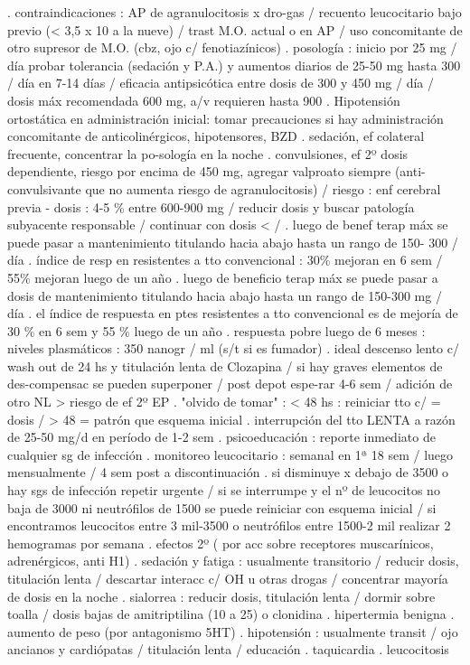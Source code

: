 . contraindicaciones : AP de agranulocitosis x dro-gas / recuento leucocitario bajo previo (< 3,5 x 10 a la nueve) / trast M.O. actual o en AP / uso concomitante de otro supresor de M.O. (cbz, ojo c/ fenotiazínicos)
. posología : inicio por 25 mg / día probar tolerancia (sedación y P.A.) y aumentos diarios de 25-50 mg hasta 300 / día en 7-14 días / eficacia antipsicótica entre dosis de 300 y 450 mg / día / dosis máx recomendada 600 mg, a/v requieren hasta 900
. Hipotensión ortostática en administración inicial: tomar precauciones si hay administración concomitante de anticolinérgicos, hipotensores, BZD
. sedación, ef colateral frecuente, concentrar la po-sología en la noche
. convulsiones, ef 2º dosis dependiente, riesgo por encima de 450 mg, agregar valproato siempre (anti-convulsivante que no aumenta riesgo de agranulocitosis) / riesgo : enf cerebral previa - dosis : 4-5 \% entre 600-900 mg / reducir dosis y buscar patología subyacente responsable / continuar con dosis < /
. luego de benef terap máx se puede pasar a mantenimiento titulando hacia abajo hasta un rango de 150- 300 / día
. índice de resp en resistentes a tto convencional : 30\% mejoran en 6 sem / 55\% mejoran luego de un año
. luego de beneficio terap máx se puede pasar a dosis de mantenimiento titulando hacia abajo hasta un rango de 150-300 mg / día
. el índice de respuesta en ptes resistentes a tto convencional es de mejoría de 30 \% en 6 sem y 55 \% luego de un año
. respuesta pobre luego de 6 meses : niveles plasmáticos : 350 nanogr / ml (s/t si es fumador)
. ideal descenso lento c/ wash out de 24 hs y titulación lenta de Clozapina / si hay graves elementos de des-compensac se pueden superponer / post depot espe-rar 4-6 sem / adición de otro NL > riesgo de ef 2º EP
. "olvido de tomar" : < 48 hs : reiniciar tto c/ = dosis / > 48 = patrón que esquema inicial
. interrupción del tto LENTA a razón de 25-50 mg/d en período de 1-2 sem
. psicoeducación : reporte inmediato de cualquier sg de infección
. monitoreo leucocitario : semanal en 1ª 18 sem / luego mensualmente / 4 sem post a discontinuación
. si disminuye x debajo de 3500 o hay sgs de infección repetir urgente / si se interrumpe y el nº de leucocitos no baja de 3000 ni neutrófilos de 1500 se puede reiniciar con esquema inicial / si encontramos leucocitos entre 3 mil-3500 o neutrófilos entre 1500-2 mil realizar 2 hemogramas por semana
. efectos 2º ( por acc sobre receptores muscarínicos, adrenérgicos, anti H1)
. sedación y fatiga : usualmente transitorio / reducir dosis, titulación lenta / descartar interacc c/ OH u otras drogas / concentrar mayoría de dosis en la noche
. sialorrea : reducir dosis, titulación lenta / dormir sobre toalla / dosis bajas de amitriptilina (10 a 25) o clonidina
. hipertermia benigna
. aumento de peso (por antagonismo 5HT)
. hipotensión : usualmente transit / ojo ancianos y cardiópatas / titulación lenta / educación
. taquicardia
. leucocitosis

